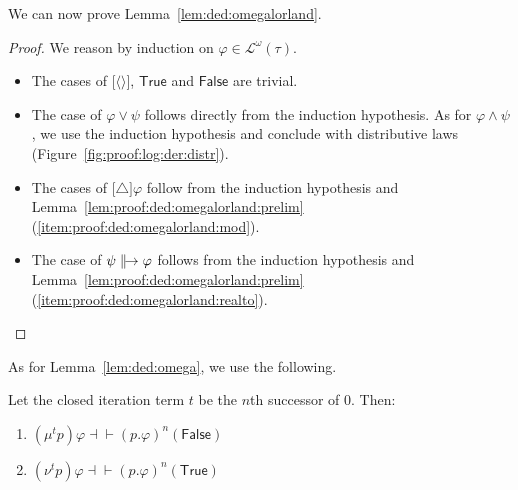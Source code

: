 \documentclass[%
  a4paper,
  UKenglish,
  cleveref,
  autoref,
  thm-restate,
  numberwithinsect,
]{lipics-v2021}
\newcommand\defthesisiff{\dashv\vdash}
\newcommand\thesisiff{\mathrel{\defthesisiff}}
\newcommand\pair[1]{{\langle #1\rangle}}
\newcommand\temp[1]{\mathsf{#1}}
\newcommand\True{\temp{True}}
\newcommand\False{\temp{False}}
\newcommand\defrealto{\mathrel\parallel\joinrel\to}
\newcommand\realto{\mathrel{\defrealto}}
\newcommand\PT{\tau}		%
\newcommand\FP{p}
\newcommand\finmu{\mu}
\newcommand\finnu{\nu}
\newcommand\Lang{\mathcal{L}}
\newcommand\form[1]{\lbrack #1 \rbrack}
\newcommand\modgen{\mathord{\triangle}}	%
\begin{document}
We can now prove Lemma~\ref{lem:ded:omegalorland}.

\LemOmegaLorLand*

\begin{proof}
We reason by induction on $\varphi \in \Lang^\omega(\PT)$.
\begin{itemize}
\item
The cases of $\form{\pair{}}$, $\True$ and $\False$ are trivial.

\item
The case of $\varphi \lor \psi$ follows directly from the induction hypothesis.
As for $\varphi \land \psi$, we use the induction hypothesis
and conclude with distributive laws (Figure~\ref{fig:proof:log:der:distr}).

\item
The cases of $\form{\modgen}\varphi$ follow from
the induction hypothesis and
Lemma~\ref{lem:proof:ded:omegalorland:prelim}(\ref{item:proof:ded:omegalorland:mod}).

\item
The case of $\psi \realto \varphi$ follows from
the induction hypothesis and
Lemma~\ref{lem:proof:ded:omegalorland:prelim}(\ref{item:proof:ded:omegalorland:realto}).
\qedhere
\end{itemize}
\end{proof}


As for Lemma~\ref{lem:ded:omega},
we use the following.

\begin{lemma}
\label{lem:proof:ded:neutralomega:prelim}
Let the closed iteration term $t$ be the $n$th successor of $0$.
Then:
\begin{enumerate}[(1)]
\item
\label{item:proof:ded:neutralomega:mu}
\(
  (\finmu^t \FP)\varphi
  \thesisiff
  (\FP. \varphi)^n(\False)
\)

\item
\label{item:proof:ded:neutralomega:nu}
\(
  (\finnu^t \FP)\varphi
  \thesisiff
  (\FP. \varphi)^n(\True)
\)
\end{enumerate}
\end{lemma}
\end{document}
